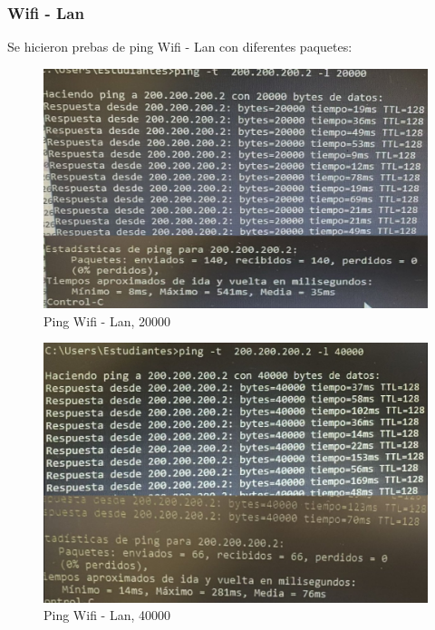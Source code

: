 \subsubsection{\textbf{Wifi - Lan}}
Se hicieron prebas de ping Wifi - Lan con diferentes paquetes:

    \begin{figure}[H]
        \centering
        \includegraphics[width=\columnwidth]{punto1/p1_ping_wifi_lan_20k.jpeg}
        \caption{Ping Wifi - Lan, 20000}
        \label{fig:ping_wifi_lan_20k}
    \end{figure}

    \begin{figure}[H]
        \centering
        \includegraphics[width=\columnwidth]{punto1/p1_ping_wifi_lan_40k.jpeg}
        \caption{Ping Wifi - Lan, 40000}
        \label{fig:ping_wifi_lan_40k}
    \end{figure}

